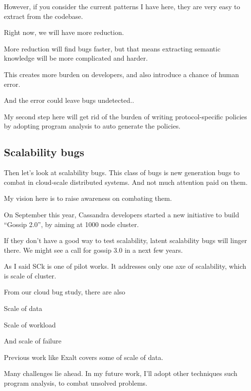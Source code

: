 However, if you consider the current patterns I have here, they are very easy
to extract from the codebase.

Right now, we will have more reduction.

More reduction will find bugs faster, but that means extracting semantic
knowledge will be more complicated and harder.

This creates more burden on developers, and also introduce a chance of human
error.

And the error could leave bugs undetected..

My second step here will get rid of the burden of writing protocol-specific
policies by adopting program analysis to auto generate the policies.


\subsection{Scalability bugs}

Then let's look at scalability bugs. This class of bugs is new generation bugs
to combat in cloud-scale distributed systems.  And not much attention paid on
them. 

My vision here is to raise awareness on combating them.

On September this year, Cassandra developers started a new initiative to build
``Gossip 2.0'', by aiming at 1000 node cluster.

If they don't have a good way to test scalability, latent scalability bugs will
linger there. We might see a call for gossip 3.0 in a next few years.


As I said SCk is one of pilot works. It addresses only one axe of scalability,
which is scale of cluster.

From our cloud bug study, there are also

Scale of data

Scale of workload

And scale of failure


Previous work like Exalt covers some of scale of data. 

Many challenges lie ahead. In my future work, I'll adopt other techniques such
program analysis, to combat unsolved problems.

